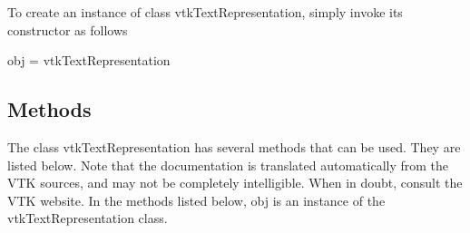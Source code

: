 To create an instance of class vtk\-Text\-Representation, simply invoke its constructor as follows \begin{DoxyVerb}  obj = vtkTextRepresentation
\end{DoxyVerb}
 \hypertarget{vtkwidgets_vtkxyplotwidget_Methods}{}\subsection{Methods}\label{vtkwidgets_vtkxyplotwidget_Methods}
The class vtk\-Text\-Representation has several methods that can be used. They are listed below. Note that the documentation is translated automatically from the V\-T\-K sources, and may not be completely intelligible. When in doubt, consult the V\-T\-K website. In the methods listed below, {\ttfamily obj} is an instance of the vtk\-Text\-Representation class. 
